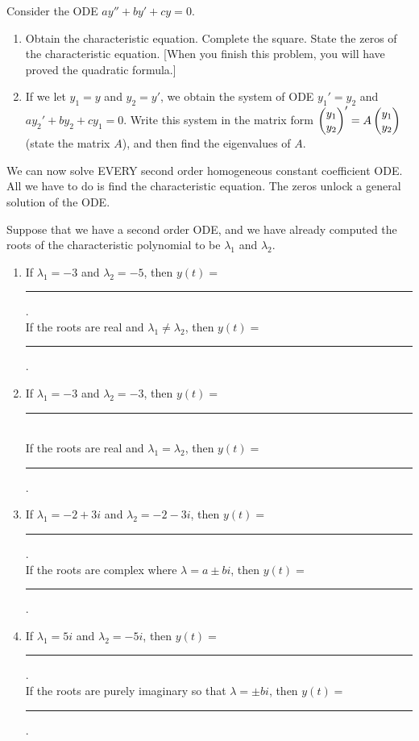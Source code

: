 \begin{problem}
 Consider the ODE $ay''+by'+cy=0$. 
\begin{enumerate}
 \item Obtain the characteristic equation. Complete the square.  State the zeros of the characteristic equation. [When you finish this problem, you will have proved the quadratic formula.]
 \item If we let $y_1=y$ and $y_2=y'$, we obtain the system of ODE $y_1'=y_2$ and $ay_2'+by_2+cy_1=0$.  
 Write this system in the  matrix form $\begin{pmatrix} y_1\\y_2 \end{pmatrix}' = A \begin{pmatrix} y_1\\y_2 \end{pmatrix}$ (state the matrix $A$), and then find the eigenvalues of $A$.  
\end{enumerate}
\end{problem}

We can now solve EVERY second order homogeneous constant coefficient ODE.  All we have to do is find the characteristic equation. The zeros unlock a general solution of the ODE.


\begin{problem}
 Suppose that we have a second order ODE, and we have already computed the roots of the characteristic polynomial to be $\lambda_1$ and $\lambda_2$. 
\begin{enumerate}
 \item If $\lambda_1=-3$ and $\lambda_2=-5$, then $y(t) = $\rule{1in}{.5pt}.\\
 If the roots are real and $\lambda_1 \neq \lambda_2$, then $y(t) = $\rule{1in}{.5pt}.
 \item If $\lambda_1=-3$ and $\lambda_2=-3$, then $y(t) = $\rule{1in}{.5pt}\\
 If the roots are real and $\lambda_1  =   \lambda_2$, then $y(t) = $\rule{1in}{.5pt}.
 \item If $\lambda_1 = -2+3i$ and $\lambda_2=-2-3i$, then $y(t) = $\rule{1in}{.5pt}. \\
 If the roots are complex where $\lambda = a\pm bi$, then $y(t) = $\rule{1in}{.5pt}.
 \item If $\lambda_1 = 5i$ and $\lambda_2=-5i$, then $y(t) = $\rule{1in}{.5pt}. \\
 If the roots are purely imaginary so that $\lambda = \pm bi$, then $y(t) = $\rule{1in}{.5pt}.
\end{enumerate}

\end{problem}




